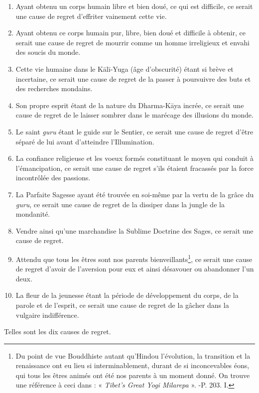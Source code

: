 \documentclass[10pt]{book}
\begin{document}
\begin{enumerate}[1.-]
\item Ayant obtenu un corps humain libre et bien doué, ce qui est difficile, ce serait une cause de regret d'effriter vainement cette vie.
\item Ayant obtenu ce corps humain pur, libre, bien doué et difficile à obtenir, ce serait une cause de regret de mourrir comme un homme irreligieux et envahi des soucis du monde.
\item Cette vie humaine dans le Kālī-Yuga (âge d'obscurité) étant si brève et incertaine, ce serait une cause de regret de la passer à poursuivre des buts et des recherches mondains.
\item Son propre esprit étant de la nature du Dharma-Kāya incrée, ce serait une cause de regret de le laisser sombrer dans le marécage des illusions du monde.
\item Le saint \textit{guru} étant le guide sur le Sentier, ce serait une cause de regret d'être séparé de lui avant d'atteindre l'Illumination.
\item La confiance religieuse et les voeux formés constituant le moyen qui conduit à l'émancipation, ce serait une cause de regret s'ils étaient fracassés par la force incontrôlée des passions.
\item La Parfaite Sagesse ayant été trouvée en soi-même par la vertu de la grâce du \textit{guru}, ce serait une cause de regret de la dissiper dans la jungle de la mondanité.
\item Vendre ainsi qu'une marchandise la Sublime Doctrine des Sages, ce serait une cause de regret.
\item Attendu que tous les êtres sont nos parents bienveillants\footnote{Du point de vue Bouddhiste autant qu'Hindou l'évolution, la transition et la renaissance ont eu lieu si interminablement, durant de si inconcevables éons, qui tous les êtres animés ont été nos parents à un moment donné. On trouve une référence à ceci dans : « \textit {Tibet's Great Yogi Milarepa} ». -P. 203. I.}, ce serait une cause de regret d'avoir de l'aversion pour eux et ainsi désavouer ou abandonner l'un deux.
\item La fleur de la jeunesse étant la période de développement du corps, de la parole et de l'esprit, ce serait une cause de regret de la gâcher dans la vulgaire indifférence.
\end{enumerate}
Telles sont les dix causes de regret.
\end{document}
